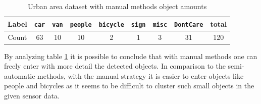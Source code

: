 \begin{table}[htp]
	\centering
	\caption{Urban area dataset with manual methods object amounts}
	\label{tab: urban2stats}
	\begin{tabular}{c|c|c|c|c|c|c|c|c}
		\textbf{Label} & \texttt{car} & \texttt{van} & \texttt{people} & \texttt{bicycle} & \texttt{sign} & \texttt{misc} & \texttt{DontCare} & \textbf{total} \\ \hline
		Count          & 63           & 10            & 10               & 2                & 1             & 3             & 31                & 120           
	\end{tabular}
\end{table}

By analyzing table \ref{tab: urban2stats} it is possible to conclude that with manual methods one can freely enter with more detail the detected objects. In comparison to the semi-automatic methods, with the manual strategy it is easier to enter objects like people and bicycles as it seems to be difficult to cluster such small objects in the given sensor data.

